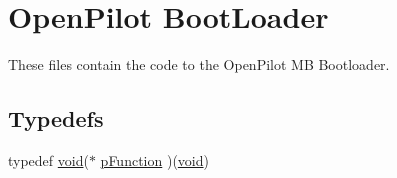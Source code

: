\hypertarget{group___open_pilot_b_l}{\section{Open\-Pilot Boot\-Loader}
\label{group___open_pilot_b_l}
}


These files contain the code to the Open\-Pilot M\-B Bootloader.  


\subsection*{Typedefs}
\begin{DoxyCompactItemize}
\item 
typedef \hyperlink{group___n_a_m_e_ga18028b8badbf1ea7e704ccac3c488e82}{void}($\ast$ \hyperlink{group___open_pilot_b_l_ga9227bf1f1a9c633a0cc9ca50cc761c1a}{p\-Function} )(\hyperlink{group___n_a_m_e_ga18028b8badbf1ea7e704ccac3c488e82}{void})
\end{DoxyCompactItemize}
